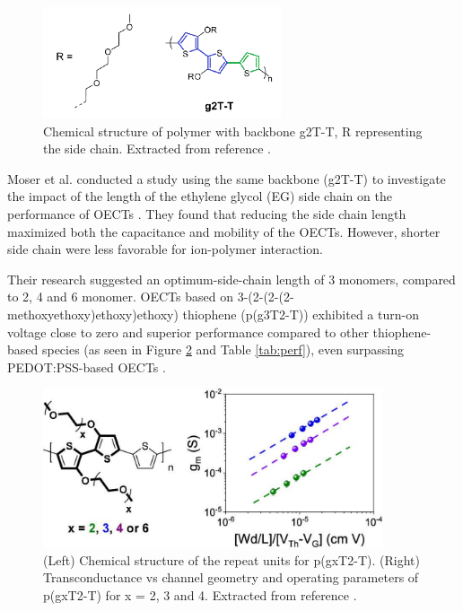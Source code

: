 \begin{figure}[h]
	\centering
	\includegraphics[width=7cm]{Images/pdf/g2T-T.pdf}
	\caption[Chemical structure of polymer g2T-T]{Chemical structure of polymer with backbone g2T-T, R representing the side chain. Extracted from reference \cite{nielsenMolecularDesignSemiconducting2016}.}
	\label{fig:g2TT}
\end{figure}

Moser et al. conducted a study using the same backbone (g2T-T) to investigate the impact of the length of the ethylene glycol (EG) side chain on the performance of OECTs 
\cite{moserEthyleneGlycolBasedSide2020}. They found that reducing the side chain length maximized both the capacitance and mobility of the OECTs. However, shorter side chain were less favorable for ion-polymer interaction. 

Their research suggested an optimum-side-chain length of 3 monomers, compared to 2, 4 and 6 monomer. OECTs based on 3-(2-(2-(2-methoxyethoxy)ethoxy)ethoxy) thiophene (p(g3T2-T)) exhibited a turn-on voltage close to zero and superior performance compared to other thiophene-based species (as seen in Figure \ref{fig:pg3t} and Table \ref{tab:perf}), even surpassing PEDOT:PSS-based OECTs \cite{inalBenchmarkingOrganicMixed2017}. %

\begin{figure}[h]
	\centering
	\includegraphics[width=10cm]{Images/pdf/pg3t+perf.pdf}
	\caption[Chemical structure and transconductance of g2T-T with side-chain engineering]{(Left) Chemical structure of the repeat units for p(gxT2-T). (Right) Transconductance vs channel geometry and operating parameters of p(gxT2-T) for x = 2, 3 and 4. Extracted from reference \cite{moserEthyleneGlycolBasedSide2020}.}
	\label{fig:pg3t}
\end{figure}

